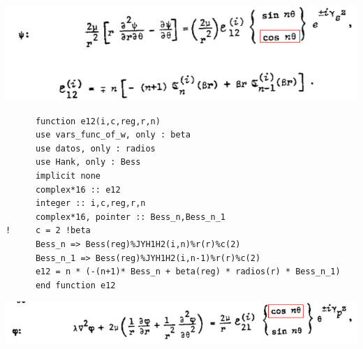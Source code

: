 \documentclass [11pt,spanish]{article}
\begin{document}
\endgroup
\includegraphics[scale=0.5]{e12}
\begingroup
\fontsize{10pt}{12pt}
\selectfont
{}
\begin{shaded}
\begin{verbatim}
      function e12(i,c,reg,r,n)
      use vars_func_of_w, only : beta
      use datos, only : radios
      use Hank, only : Bess
      implicit none
      complex*16 :: e12
      integer :: i,c,reg,r,n
      complex*16, pointer :: Bess_n,Bess_n_1
!     c = 2 !beta
      Bess_n => Bess(reg)%JYH1H2(i,n)%r(r)%c(2)
      Bess_n_1 => Bess(reg)%JYH1H2(i,n-1)%r(r)%c(2)
      e12 = n * (-(n+1)* Bess_n + beta(reg) * radios(r) * Bess_n_1)
      end function e12
\end{verbatim}
\end{shaded}
\endgroup
\includegraphics[scale=0.5]{e21a}
\end{document}
